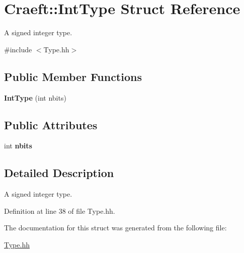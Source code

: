 \hypertarget{struct_craeft_1_1_int_type}{}\section{Craeft\+:\+:Int\+Type Struct Reference}
\label{struct_craeft_1_1_int_type}


A signed integer type.  




{\ttfamily \#include $<$Type.\+hh$>$}

\subsection*{Public Member Functions}
\begin{DoxyCompactItemize}
\item 
\hypertarget{struct_craeft_1_1_int_type_aa878af97376f5d00b53be1c339cb5075}{}\label{struct_craeft_1_1_int_type_aa878af97376f5d00b53be1c339cb5075} 
{\bfseries Int\+Type} (int nbits)
\end{DoxyCompactItemize}
\subsection*{Public Attributes}
\begin{DoxyCompactItemize}
\item 
\hypertarget{struct_craeft_1_1_int_type_a49597f2ccedcd46664615192e897e6a5}{}\label{struct_craeft_1_1_int_type_a49597f2ccedcd46664615192e897e6a5} 
int {\bfseries nbits}
\end{DoxyCompactItemize}


\subsection{Detailed Description}
A signed integer type. 

Definition at line 38 of file Type.\+hh.



The documentation for this struct was generated from the following file\+:\begin{DoxyCompactItemize}
\item 
\hyperlink{_type_8hh}{Type.\+hh}\end{DoxyCompactItemize}
